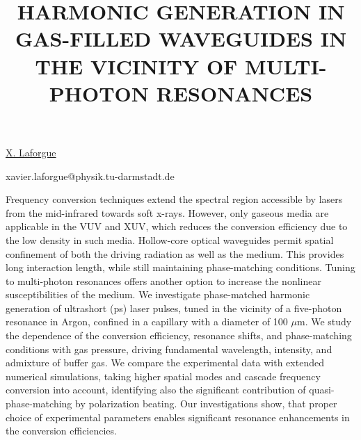 \title{HARMONIC GENERATION IN GAS-FILLED WAVEGUIDES IN THE VICINITY OF MULTI-PHOTON RESONANCES}

\underline{X. Laforgue} 

{\normalsize{\vspace{-4mm}
\darmstadt

\dijon

\email xavier.laforgue@physik.tu-darmstadt.de}}

Frequency conversion techniques extend the spectral region accessible by lasers from the mid-infrared towards soft x-rays. However, only gaseous media are applicable in the VUV and XUV, which reduces the conversion efficiency due to the low density in such media. Hollow-core optical waveguides permit spatial confinement of both the driving radiation as well as the medium. This provides long interaction length, while still maintaining phase-matching conditions. Tuning to multi-photon resonances offers another option to increase the nonlinear susceptibilities of the medium. We investigate phase-matched harmonic generation of ultrashort (ps) laser pulses, tuned in the vicinity of a five-photon resonance in Argon, confined in a capillary with a diameter of 100 $\mu$m. We study the dependence of the conversion efficiency, resonance shifts, and phase-matching conditions with gas pressure, driving fundamental wavelength, intensity, and admixture of buffer gas. We compare the experimental data with extended numerical simulations, taking higher spatial modes and cascade frequency conversion into account, identifying also the significant contribution of quasi-phase-matching by polarization beating. Our investigations show, that proper choice of experimental parameters enables significant resonance enhancements in the conversion efficiencies.

\vspace{\baselineskip} 